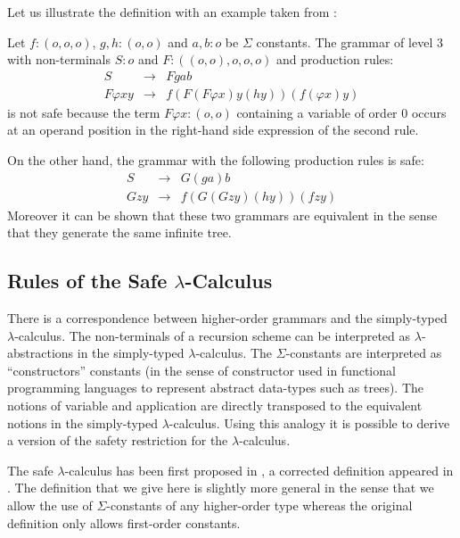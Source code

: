 Let us illustrate the definition with an example taken from \cite{KNU02}:
\begin{example} Let $f:(o,o,o)$, $g,h:(o,o)$ and $a,b:o$ be $\Sigma$ constants.
 The grammar of level 3 with non-terminals $S:o$ and $F: ((o,o),o,o,o)$ and production rules:
\begin{eqnarray*}
    S &\rightarrow&  F g a b \\
    F \varphi x y &\rightarrow& f ( F ( F \varphi x ) y (h y)) (f (\varphi x) y)
\end{eqnarray*}
is not safe because the term $F \varphi x : (o,o)$ containing a variable of order $0$
occurs at an operand position in the right-hand side expression of the second rule.

On the other hand, the grammar with the following production rules is safe:
\begin{eqnarray*}
    S &\rightarrow&  G (g a) b \\
    G z y &\rightarrow& f ( G ( G z y) (h y)) (f z y)
\end{eqnarray*}
Moreover it can be shown that these two grammars are equivalent in the sense that they generate the same
infinite tree.
\end{example}


\subsection{Rules of the Safe $\lambda$-Calculus}

There is a correspondence between higher-order grammars and the simply-typed $\lambda$-calculus. The non-terminals of a recursion scheme can be interpreted as $\lambda$-abstractions in the
simply-typed $\lambda$-calculus. The $\Sigma$-constants are
interpreted as ``constructors'' constants (in the sense of
constructor used in functional programming languages to represent
abstract data-types such as trees). The notions of variable and
application are directly transposed to the equivalent notions in the
simply-typed $\lambda$-calculus. Using this analogy it is possible
to derive a version of the safety restriction for the
$\lambda$-calculus.

The safe $\lambda$-calculus has been first proposed in
\cite{DBLP:conf/fossacs/AehligMO05}, a corrected definition appeared
in \cite{Ong2005}. The definition that we give here is slightly more
general in the sense that we allow the use of $\Sigma$-constants of
any higher-order type whereas the original definition only allows
first-order constants.


